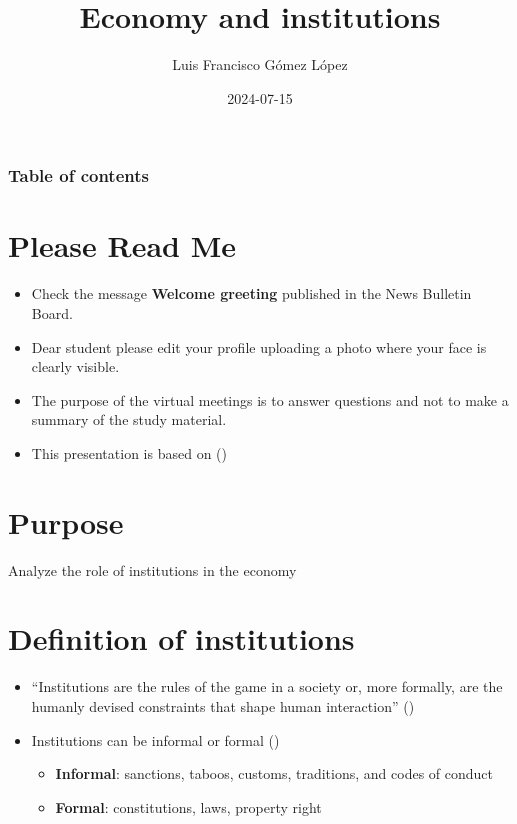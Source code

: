 \documentclass[
  ignorenonframetext,
]{beamer}
\title{Economy and institutions}
\author{Luis Francisco Gómez López}
\date{2024-07-15}
\institute{FAEDIS}
\renewcommand*\contentsname{Table of contents}
\newcommand\contentsname{Table of contents}
\begin{document}
\frame{\titlepage}

\renewcommand*\contentsname{Table of contents}
\begin{frame}[allowframebreaks]
  \frametitle{Table of contents}
  \tableofcontents[hideallsubsections]
\end{frame}

\section{Please Read Me}\label{please-read-me}

\begin{frame}{}
\label{section}
\begin{itemize}
\item
  Check the message \textbf{Welcome greeting} published in the News
  Bulletin Board.
\item
  Dear student please edit your profile uploading a photo where your
  face is clearly visible.
\item
  The purpose of the virtual meetings is to answer questions and not to
  make a summary of the study material.
\item
  This presentation is based on
  ()
\end{itemize}
\end{frame}

\section{Purpose}\label{purpose}

\begin{frame}{}
\label{section-1}
Analyze the role of institutions in the economy
\end{frame}

\section{Definition of institutions}\label{definition-of-institutions}

\begin{frame}{}
\label{section-2}
\begin{itemize}
\item
  ``Institutions are the rules of the game in a society or, more
  formally, are the humanly devised constraints that shape human
  interaction'' ()
\item
  Institutions can be informal or formal
  ()

  \begin{itemize}
  \item
    \textbf{Informal}: sanctions, taboos, customs, traditions, and codes
    of conduct
  \item
    \textbf{Formal}: constitutions, laws, property right
  \end{itemize}
\end{itemize}
\end{frame}
\end{document}
